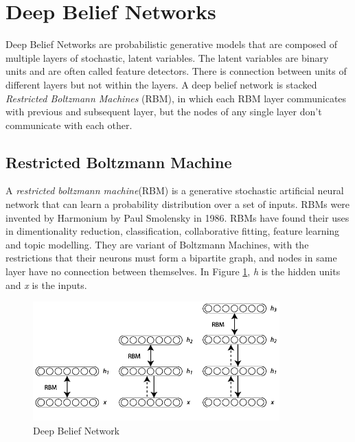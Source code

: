 \documentclass[12pt, a4paper]{report}
\begin{document}
\section{Deep Belief Networks}\label{sec:deep_belief_network}

Deep Belief Networks are probabilistic generative models that are composed of multiple layers of stochastic, latent variables. The latent variables are binary units and are often called feature detectors\cite{DBN}. There is connection between units of different layers but not within the layers.
A deep belief network is stacked \textit{Restricted Boltzmann Machines} (RBM), in which each RBM layer communicates with previous and subsequent layer, but the nodes of any single layer don't communicate with each other.

\subsection{Restricted Boltzmann Machine}\label{sec:RBM}

A \textit{restricted boltzmann machine}(RBM) is a generative stochastic artificial neural network that can learn a probability distribution over a set of inputs. RBMs were invented by Harmonium by Paul Smolensky in 1986\cite{RBM}. RBMs have found their uses in dimentionality reduction, classification, collaborative fitting, feature learning and topic modelling\cite{RBMuses}. They are variant of Boltzmann Machines, with the restrictions that their neurons must form a bipartite graph, and nodes in same layer have no connection between themselves. In Figure \ref{fig:RBM}, \textit{h} is the hidden units and \textit{x} is the inputs.\\ \par

\begin{figure}[h]
\centering
\includegraphics[width=9.5cm]{DBN.png}
\caption{Deep Belief Network}
\label{fig:RBM}
\end{figure}
\end{document}
